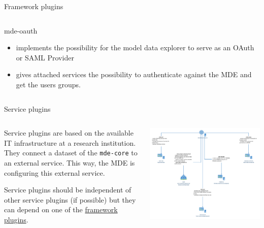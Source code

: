 \begin{frame}{Framework plugins}
\begin{columns}[T]
\begin{column}{0.45\textwidth}
            \begin{block}{mde-oauth}
                \begin{itemize}
                    \item implements the possibility for the model data
                        explorer to serve as an OAuth or SAML Provider
                    \item gives attached services the possibility to
                        authenticate against the MDE and get
                        the users groups.
                \end{itemize}
            \end{block}
        \end{column}
    \end{columns}
\end{frame}

\begin{frame}{Service plugins} \label{frm:service-plugins}
    \begin{columns}
        \begin{column}{0.3\textwidth}
            Service plugins are based on the available IT infrastructure at a
            research institution. They connect a dataset of the
            \lstinline|mde-core| to an external service. This way, the MDE is
            configuring this external service.

            Service plugins should be independent of other service plugins (if
            possible) but they can depend on one of the
            \hyperlink{frm:framework-plugins}{framework plugins}.
        \end{column}
        \begin{column}{0.7\textwidth}
            \includegraphics[width=\textwidth, page=3]{figures/mde-service-plugins-basic.pdf}
        \end{column}
    \end{columns}
\end{frame}

